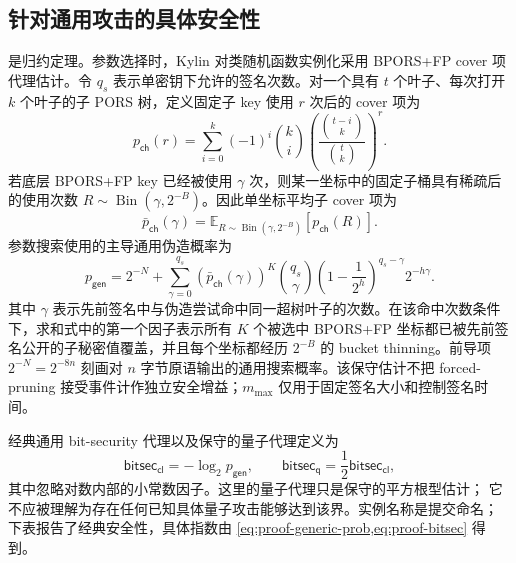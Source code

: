 \subsection{针对通用攻击的具体安全性}
\label{sec:proof-concrete}

 是归约定理。参数选择时，Kylin 对类随机函数实例化采用 BPORS+FP cover 项代理估计。令 $q_s$ 表示单密钥下允许的签名次数。对一个具有 $t$ 个叶子、每次打开 $k$ 个叶子的子 PORS 树，定义固定子 key 使用 $r$ 次后的 cover 项为
\begin{equation}
\label{eq:proof-bpors-child-cover}
    p_{\mathsf{ch}}(r)
    =
    \sum_{i=0}^{k}(-1)^i\binom{k}{i}
    \left(\frac{\binom{t-i}{k}}{\binom{t}{k}}\right)^r .
\end{equation}
若底层 BPORS+FP key 已经被使用 $\gamma$ 次，则某一坐标中的固定子桶具有稀疏后的使用次数 $R\sim\operatorname{Bin}(\gamma,2^{-B})$。因此单坐标平均子 cover 项为
\begin{equation}
\label{eq:proof-bpors-thinned-cover}
    \bar p_{\mathsf{ch}}(\gamma)
    =
    \mathbb{E}_{R\sim\operatorname{Bin}(\gamma,2^{-B})}
    \left[p_{\mathsf{ch}}(R)\right].
\end{equation}
参数搜索使用的主导通用伪造概率为
\begin{equation}
\label{eq:proof-generic-prob}
p_{\mathsf{gen}}
=2^{-N}
+\sum_{\gamma=0}^{q_s}
\left(\bar p_{\mathsf{ch}}(\gamma)\right)^K
\binom{q_s}{\gamma}
\left(1-\frac{1}{2^h}\right)^{q_s-\gamma}
2^{-h\gamma}.
\end{equation}
其中 $\gamma$ 表示先前签名中与伪造尝试命中同一超树叶子的次数。在该命中次数条件下，求和式中的第一个因子表示所有 $K$ 个被选中 BPORS+FP 坐标都已被先前签名公开的子秘密值覆盖，并且每个坐标都经历 $2^{-B}$ 的 bucket thinning。前导项 $2^{-N}=2^{-8n}$ 刻画对 $n$ 字节原语输出的通用搜索概率。该保守估计不把 forced-pruning 接受事件计作独立安全增益；$m_{\max}$ 仅用于固定签名大小和控制签名时间。

经典通用 bit-security 代理以及保守的量子代理定义为
\begin{equation}
\label{eq:proof-bitsec}
    \mathsf{bitsec}_{\mathsf{cl}}=-\log_2 p_{\mathsf{gen}},
    \qquad
    \mathsf{bitsec}_{\mathsf{q}}=\frac{1}{2}\mathsf{bitsec}_{\mathsf{cl}},
\end{equation}
其中忽略对数内部的小常数因子。这里的量子代理只是保守的平方根型估计；
它不应被理解为存在任何已知具体量子攻击能够达到该界。实例名称是提交命名；
下表报告了经典安全性，具体指数由
\cref{eq:proof-generic-prob,eq:proof-bitsec} 得到。

